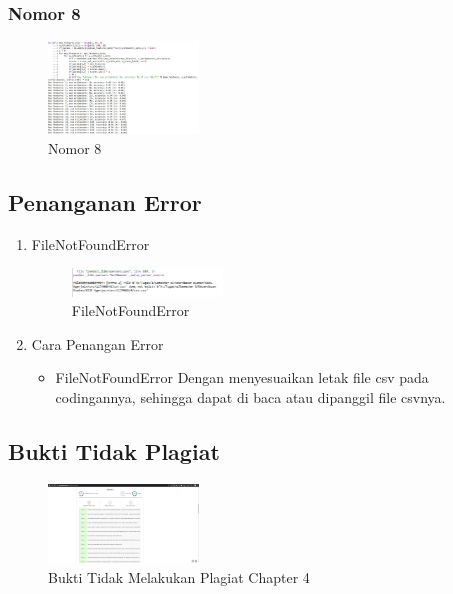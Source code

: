 \subsubsection{Nomor 8}
\hfill\break

\begin{figure}[H]
\centering
\includegraphics[width=4cm]{figures/1174074/4/no8.jpg}
\caption{Nomor 8}
\end{figure}

\subsection{Penanganan Error}
\begin{enumerate}
	\item FileNotFoundError
	\begin{figure}[H]
		\includegraphics[width=4cm]{figures/1174074/4/error1.jpg}
		\centering
		\caption{FileNotFoundError}
	\end{figure}
	\item Cara Penangan Error
	\begin{itemize}
		\item FileNotFoundError
		\hfill\break
		Dengan menyesuaikan letak file csv pada codingannya, sehingga dapat  di baca atau dipanggil file csvnya.
	\end{itemize}
\end{enumerate}

\subsection{Bukti Tidak Plagiat}
\begin{figure}[H]
\centering
	\includegraphics[width=4cm]{figures/1174074/4/plagiat.jpg}
	\caption{Bukti Tidak Melakukan Plagiat Chapter 4}
\end{figure}

